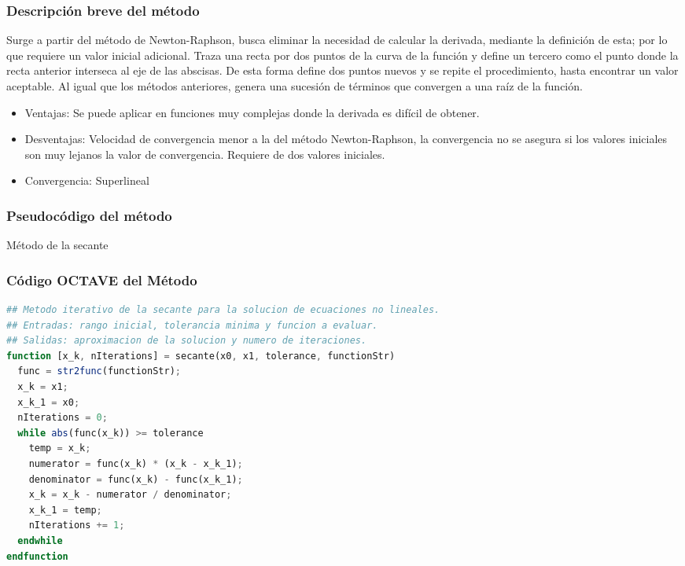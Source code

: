 \documentclass[12pt]{article}
\begin{document}
\subsubsection{Descripción breve del método}
Surge a partir del método de Newton-Raphson, busca eliminar la necesidad de calcular la derivada, mediante la definición de esta; por lo que requiere un valor inicial adicional. Traza una recta por dos puntos de la curva de la función y define un tercero como el punto donde la recta anterior interseca al eje de las abscisas. De esta forma define dos puntos nuevos y se repite el procedimiento, hasta encontrar un valor aceptable. Al igual que los métodos anteriores, genera una sucesión de términos que convergen a una raíz de la función.

\begin{itemize}
    \item Ventajas: Se puede aplicar en funciones muy complejas donde la derivada es difícil de obtener.
    \item Desventajas: Velocidad de convergencia menor a la del método Newton-Raphson, la convergencia no se asegura si los valores iniciales son muy lejanos la valor de convergencia. Requiere de dos valores iniciales.
    \item Convergencia: Superlineal
\end{itemize}

\subsubsection{Pseudocódigo del método}
\begin{algorithm}[H]
\caption{Método de la secante}
     \SetAlgoLined

\end{algorithm}

\subsubsection{Código OCTAVE del Método}

\begin{lstlisting}[language=OCTAVE, caption=Implementación del método de la secante en Octave]
## Metodo iterativo de la secante para la solucion de ecuaciones no lineales.
## Entradas: rango inicial, tolerancia minima y funcion a evaluar.
## Salidas: aproximacion de la solucion y numero de iteraciones.
function [x_k, nIterations] = secante(x0, x1, tolerance, functionStr)
  func = str2func(functionStr);
  x_k = x1;
  x_k_1 = x0;
  nIterations = 0;
  while abs(func(x_k)) >= tolerance
    temp = x_k;
    numerator = func(x_k) * (x_k - x_k_1);
    denominator = func(x_k) - func(x_k_1);
    x_k = x_k - numerator / denominator;
    x_k_1 = temp;
    nIterations += 1;
  endwhile
endfunction
\end{lstlisting}
\end{document}
